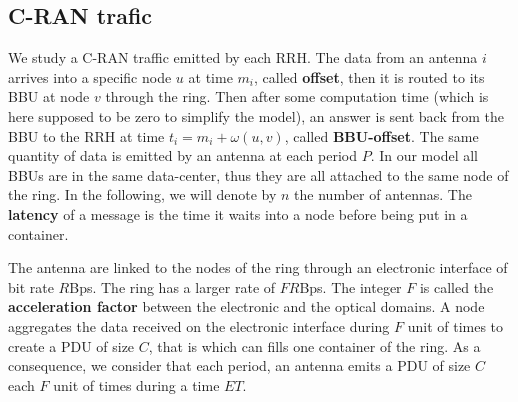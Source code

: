 \documentclass[]{algotel}
\begin{document}
   \subsection{C-RAN trafic}
   
   We study a C-RAN traffic emitted by each RRH. The data from an antenna $i$ arrives into a specific node $u$ at time $m_i$, called  {\bf offset}, then it is routed to its BBU at node $v$ through the ring. Then after some computation time (which is here supposed to be zero to simplify the model),
   an answer is sent back from the BBU to the RRH at time $t_i = m_i + \omega(u,v)$, called {\bf BBU-offset}. The same quantity of data is emitted by an antenna at each period $P$. 
   In our model all BBUs are in the same data-center, thus they are all attached to the same node of the ring. In the following, we will denote by $n$ the number of antennas.
The {\bf latency} of a message is the time it waits into a node before being put in a container.

   The antenna are linked to the nodes of the ring through an electronic interface of bit rate $R$Bps.
   The ring has a larger rate of $FR$Bps. The integer $F$ is called the {\bf acceleration factor} between the electronic and the optical domains. A node aggregates the data received on the electronic interface during $F$ unit of times to create a PDU of size $C$, that is which can fills one container of the ring. As a consequence, we consider that each period, an antenna emits a PDU of size $C$ each $F$ unit of times during a time $ET$.
    
\end{document}
